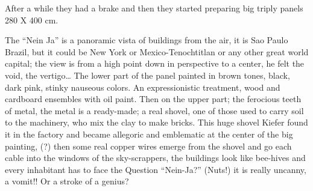 \documentclass[smalldemyvopaper,11pt,twoside,onecolumn,openright,extrafontsizes]{memoir}
\begin{document}
After a while they had a brake and then they started preparing big triply panels 280 X 400 cm.

The “Nein Ja” is a panoramic vista of buildings from the air, it is Sao Paulo Brazil, but it could be New York or Mexico-Tenochtitlan or any other great world capital; the view is from a high point down in perspective to a center, he felt the void, the vertigo… The lower part of the panel painted in brown tones, black, dark pink, stinky nauseous colors. An expressionistic treatment, wood and cardboard ensembles with oil paint. Then on the upper part; the ferocious teeth of metal, the metal is a ready-made; a real shovel, one of those used to carry soil to the machinery, who mix the clay to make bricks. This huge shovel Kiefer found it in the factory and became allegoric and emblematic at the center of the big painting, (?) then some real copper wires emerge from the shovel and go each cable into the windows of the sky-scrappers, the buildings look like bee-hives and every inhabitant has to face the Question “Nein-Ja?” (Nuts!) it is really uncanny, a vomit!! Or a stroke of a genius?
\end{document}
